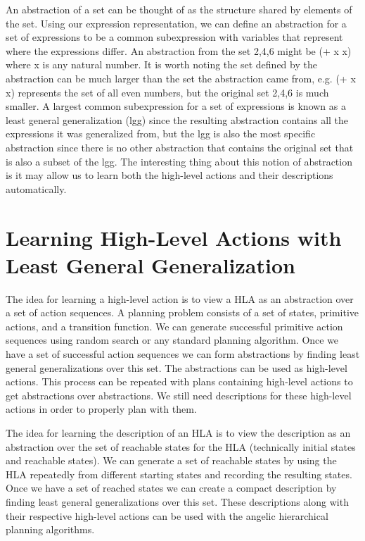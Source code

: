 \documentclass[a4paper,12pt]{article}
\begin{document}
An abstraction of a set can be thought of as the structure shared by elements of the set.  Using our expression representation, we can define an abstraction for a set of expressions to be a common subexpression with variables that represent where the expressions differ.    An abstraction from the set {2,4,6} might be (+ x x) where x is any natural number.  It is worth noting the set defined by the abstraction can be much larger than the set the abstraction came from, e.g. (+ x x) represents the set of all even numbers, but the original set {2,4,6} is much smaller.  A largest common subexpression for a set of expressions is known as a least general generalization (lgg) since the resulting abstraction contains all the expressions it was generalized from, but the lgg is also the most specific abstraction since there is no other abstraction that contains the original set that is also a subset of the lgg.  The interesting thing about this notion of abstraction is it may allow us to learn both the high-level actions and their descriptions automatically.

\section{Learning High-Level Actions with Least General Generalization}
The idea for learning a high-level action is to view a HLA as an abstraction over a set of action sequences.  A planning problem consists of a set of states, primitive actions, and a transition function.  We can generate successful primitive action sequences using random search or any standard planning algorithm.  Once we have a set of successful action sequences we can form abstractions by finding least general generalizations over this set.  The abstractions can be used as high-level actions.  This process can be repeated with plans containing high-level actions to get abstractions over abstractions.  We still need descriptions for these high-level actions in order to properly plan with them.

The idea for learning the description of an HLA is to view the description as an abstraction over the set of reachable states for the HLA (technically initial states and reachable states).  We can generate a set of reachable states by using the HLA repeatedly from different starting states and recording the resulting states.  Once we have a set of reached states we can create a compact description by finding least general generalizations over this set.  These descriptions along with their respective high-level actions can be used with the angelic hierarchical planning algorithms.
\end{document}

